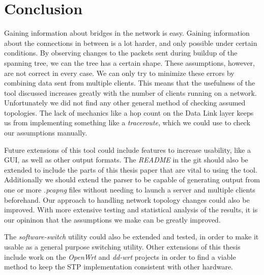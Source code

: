 \chapter{Conclusion}
Gaining information about bridges in the network is easy.
Gaining information about the connections in between is a lot harder, and only possible under certain conditions.
By observing changes to the packets sent during buildup of the spanning tree, we can the tree has a certain shape.
These assumptions, however, are not correct in every case.
We can only try to minimize these errors by combining data sent from multiple clients.
This means that the usefulness of the tool discussed increases greatly with the number of clients running on a network.
Unfortunately we did not find any other general method of checking assumed topologies.
The lack of mechanics like a hop count on the Data Link layer keeps us from implementing something like a \textit{traceroute}, which we could use to check our assumptions manually.

Future extensions of this tool could include features to increase usability, like a GUI, as well as other output formats.
The \textit{README} in the git should also be extended to include the parts of this thesis paper that are vital to using the tool.
Additionally we should extend the parser to be capable of generating output from one or more \textit{.pcapng} files without needing to launch a server and multiple clients beforehand.
Our approach to handling network topology changes could also be improved.
With more extensive testing and statistical analysis of the results, it is our opininon that the assumptions we make can be greatly improved.

The \textit{software-switch} utility could also be extended and tested, in order to make it usable as a general purpose switching utility.
Other extensions of this thesis include work on the \textit{OpenWrt} and \textit{dd-wrt} projects in order to find a viable method to keep the STP implementation consistent with other hardware.
